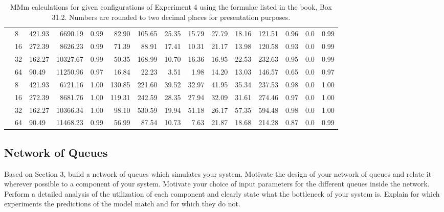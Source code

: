 \begin{table}
\begin{adjustwidth}{-1cm}{}
{\begin{tabular}{lllrrrrrrrrrrrr}
                        \addlinespace
                        192     & 8  & 421.93 & 6690.19   & 0.99   & 82.90  & 105.65 & 25.35 & 15.79 & 27.79 & 18.16 & 121.51          & 0.96      & 0.0   & 0.99 \\
                                & 16 & 272.39 & 8626.23   & 0.99   & 71.39  & 88.91  & 17.41 & 10.31 & 21.17 & 13.98 & 120.58          & 0.93      & 0.0   & 0.99 \\
                                & 32 & 162.27 & 10327.67  & 0.99   & 50.35  & 168.99 & 10.70 & 16.36 & 16.95 & 22.53 & 232.63          & 0.95      & 0.0   & 0.99 \\
                                & 64 & 90.49  & 11250.96  & 0.97   & 16.84  & 22.23  & 3.51  & 1.98  & 14.20 & 13.03 & 146.57          & 0.65      & 0.0   & 0.97 \\
                        \addlinespace
                        288     & 8  & 421.93 & 6721.16   & 1.00   & 130.85 & 221.60 & 39.52 & 32.97 & 41.95 & 35.34 & 237.53          & 0.98      & 0.0   & 1.00 \\
                                & 16 & 272.39 & 8681.76   & 1.00   & 119.31 & 242.59 & 28.35 & 27.94 & 32.09 & 31.61 & 274.46          & 0.97      & 0.0   & 1.00 \\
                                & 32 & 162.27 & 10366.34  & 1.00   & 98.10  & 530.59 & 19.94 & 51.18 & 26.17 & 57.35 & 594.48          & 0.98      & 0.0   & 1.00 \\
                                & 64 & 90.49  & 11468.23  & 0.99   & 56.99  & 87.54  & 10.73 & 7.63  & 21.87 & 18.68 & 214.28          & 0.87      & 0.0   & 0.99 \\
                        \bottomrule
                    \end{tabular}
                    \caption{MMm calculations for given configurations of Experiment 4 using the formulae listed in
                             the book, Box 31.2. Numbers are rounded to two decimal places for presentation
                             purposes.\label{tab:7_mmm}}
                }
            \end{adjustwidth}
        \end{table}

        \subsection{Network of Queues\label{subsec:7_noc}}

    Based on Section 3, build a network of queues which simulates your system. Motivate the design of your network of queues and relate it wherever possible to a component of your system. Motivate your choice of input parameters for the different queues inside the network. Perform a detailed analysis of the utilization of each component and clearly state what the bottleneck of your system is. Explain for which experiments the predictions of the model match and for which they do not.
